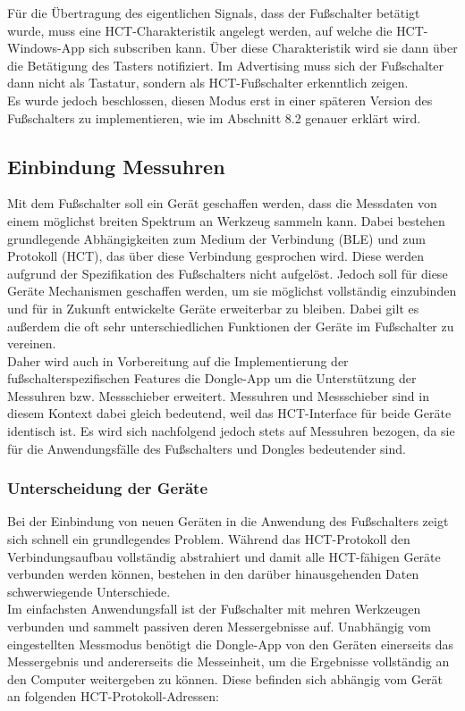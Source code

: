 Für die Übertragung des eigentlichen Signals, dass der Fußschalter betätigt wurde, muss eine \ac{HCT}-Charakteristik angelegt werden, auf welche die \ac{HCT}-Windows-App sich subscriben kann. Über diese Charakteristik wird sie dann über die Betätigung des Tasters notifiziert. Im Advertising muss sich der Fußschalter dann nicht als Tastatur, sondern als \ac{HCT}-Fußschalter erkenntlich zeigen.\\
Es wurde jedoch beschlossen, diesen Modus erst in einer späteren Version des Fußschalters zu implementieren, wie im Abschnitt 8.2 genauer erklärt wird.

\subsection{Einbindung Messuhren}
Mit dem Fußschalter soll ein Gerät geschaffen werden, dass die Messdaten von einem möglichst breiten Spektrum an Werkzeug sammeln kann. Dabei bestehen grundlegende Abhängigkeiten zum Medium der Verbindung (\ac{BLE}) und zum Protokoll (\ac{HCT}), das über diese Verbindung gesprochen wird. Diese werden aufgrund der Spezifikation des Fußschalters nicht aufgelöst. Jedoch soll für diese Geräte Mechanismen geschaffen werden, um sie möglichst vollständig einzubinden und für in Zukunft entwickelte Geräte erweiterbar zu bleiben. Dabei gilt es außerdem die oft sehr unterschiedlichen Funktionen der Geräte im Fußschalter zu vereinen.\\
Daher wird auch in Vorbereitung auf die Implementierung der fußschalterspezifischen Features die Dongle-App um die Unterstützung der Messuhren bzw. Messschieber erweitert. Messuhren und Messschieber sind in diesem Kontext dabei gleich bedeutend, weil das \ac{HCT}-Interface für beide Geräte identisch ist. Es wird sich nachfolgend jedoch stets auf Messuhren bezogen, da sie für die Anwendungsfälle des Fußschalters und Dongles bedeutender sind.

\subsubsection{Unterscheidung der Geräte}
Bei der Einbindung von neuen Geräten in die Anwendung des Fußschalters zeigt sich schnell ein grundlegendes Problem. Während das \ac{HCT}-Protokoll den Verbindungsaufbau vollständig abstrahiert und damit alle \ac{HCT}-fähigen Geräte verbunden werden können, bestehen in den darüber hinausgehenden Daten schwerwiegende Unterschiede.\\
Im einfachsten Anwendungsfall ist der Fußschalter mit mehren Werkzeugen verbunden und sammelt passiven deren Messergebnisse auf. Unabhängig vom eingestellten Messmodus benötigt die Dongle-App von den Geräten einerseits das Messergebnis und andererseits die Messeinheit, um die Ergebnisse vollständig an den Computer weitergeben zu können. Diese befinden sich abhängig vom Gerät an folgenden \ac{HCT}-Protokoll-Adressen:

